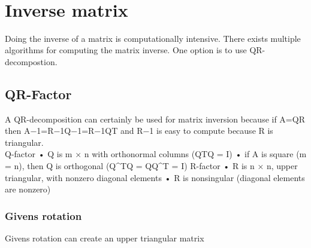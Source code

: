\\ 





\section{Inverse matrix}
Doing the inverse of a matrix is computationally intensive. There exists multiple algorithms for computing the matrix inverse. One option is to use QR-decompostion.  

\subsection{QR-Factor}

A QR-decomposition can certainly be used for matrix inversion because if A=QR then A−1=R−1Q−1=R−1QT and R−1 is easy to compute because R is triangular.\\
Q-factor
• Q is m × n with orthonormal columns (QTQ = I)
• if A is square (m = n), then Q is orthogonal (Q^TQ = QQ^T = I)
R-factor
• R is n × n, upper triangular, with nonzero diagonal elements
• R is nonsingular (diagonal elements are nonzero)

\subsubsection{Givens rotation}

Givens rotation can create an upper triangular matrix

